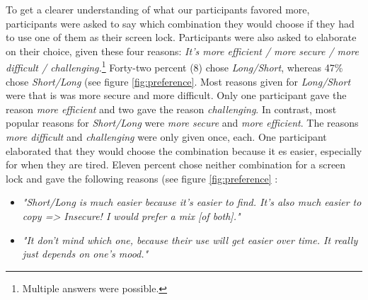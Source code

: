 To get a clearer understanding of what our participants favored more, participants were asked to say which combination they would choose if they had to use one of them as their screen lock. Participants were also asked to elaborate on their choice, given these four reasons: \textit{It's more efficient / more secure / more difficult / challenging.}\footnote{Multiple answers were possible.}
Forty-two percent (8) chose \textit{Long/Short}, whereas 47\% chose \textit{Short/Long} (see figure \ref{fig:preference}. Most reasons given for \textit{Long/Short} were that is was more secure and more difficult. Only one participant gave the reason \textit{more efficient} and two gave the reason \textit{challenging}. In contrast, most popular reasons for \textit{Short/Long} were \textit{more secure} and \textit{more efficient}. The reasons \textit{more difficult} and \textit{challenging} were only given once, each. One participant elaborated that they would choose the combination because it es easier, especially for when they are tired. Eleven percent chose neither combination for a screen lock and gave the following reasons (see figure \ref{fig:preference} : 
\begin{itemize}
    \item \textit{"Short/Long is much easier because it's easier to find. It's also much easier to copy => Insecure! I would prefer a mix [of both]."}
    \item \textit{"It don't mind which one, because their use will get easier over time. It really just depends on one's mood."} 
\end{itemize}





